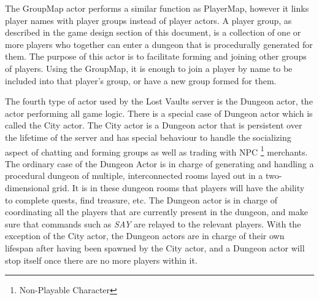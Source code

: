 \documentclass[a4paper]{article}
\begin{document}
The GroupMap actor performs a similar function as PlayerMap, however it links player names with player groups instead of player actors. A player group, as described in the game design 
section of this document, is a collection of one or more players who together can enter a dungeon that is procedurally generated for them. The purpose of this actor is to facilitate 
forming and joining other groups of players. Using the GroupMap, it is enough to join a player by name to be included into that player's group, or have a new group formed for them.

The fourth type of actor used by the Lost Vaults server is the Dungeon actor, the actor performing all game logic. There is a special case of Dungeon actor which is called the City actor. 
The City actor is a Dungeon actor that is persistent over the lifetime of the server and has special behaviour to handle the socializing aspect of chatting and forming groups as well as trading 
with NPC \footnote{Non-Playable Character} merchants. The ordinary case of the Dungeon Actor is in charge of generating and handling a procedural dungeon of multiple, interconnected rooms layed out in a two-dimensional 
grid. It is in these dungeon rooms that players will have the ability to complete quests, find treasure, etc. The Dungeon actor is in charge of coordinating all the players that are 
currently present in the dungeon, and make sure that commands such as \textit{SAY} are relayed to the relevant players. With the exception of the City actor, the Dungeon actors are 
in charge of their own lifespan after having been spawned by the City actor, and a Dungeon actor will stop itself once there are no more players within it.
\end{document}
